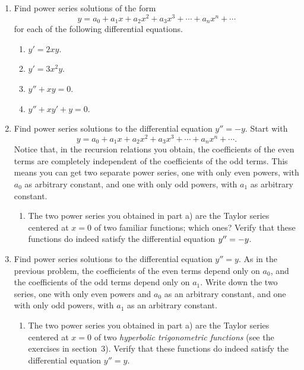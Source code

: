 \begin{enumerate}
\item Find power series solutions of the form
\[
y = a_0 + a_1x + a_2 x^2 + a_3 x^3 + \cdots + a_n x^n + \cdots
\]
for each of the following differential equations.

  \begin{enumerate}
  \item $y' = 2xy$.

  \item $y'=3x^2y$.

  \item $y'' + xy = 0$.

  \item $y'' + xy' + y = 0$.




\end{enumerate}
\item Find power series solutions to the differential equation
$y''=-y$.  Start with
\[
y = a_0 + a_1x + a_2 x^2 + a_3 x^3 + \cdots + a_n x^n + \cdots .
\]
Notice that, in the recursion relations you obtain, the coefficients
of the even terms are completely independent of the coefficients of
the odd terms.  This means you can get two separate power series, one
with only even powers, with $a_0$ as arbitrary constant, and one with
only odd powers, with $a_1$ as arbitrary constant.

  \begin{enumerate}
  \item The two power
series you obtained in part a) are the Taylor series centered at $x=0$
of two familiar functions; which ones?  Verify that these functions do
indeed satisfy the differential equation $y''=-y\/$.


\end{enumerate}
\item Find power series solutions to the differential equation
$y''=y$.  As in the previous problem, the coefficients of the even
terms depend only on $a_0$, and the coefficients of the odd terms
depend only on $a_1$.  Write down the two series, one with only even
powers and $a_0$ as an arbitrary constant, and one with only odd
powers, with $a_1$ as an arbitrary constant.

  \begin{enumerate}
  \item The two power series you obtained in part a) are the Taylor
series centered at $x=0$ of two {\em hyperbolic trigonometric
  functions\/} (see the exercises in section~3).  Verify that these
functions do indeed satisfy the differential equation
$y''=y$.



\end{enumerate}
\end{enumerate}
